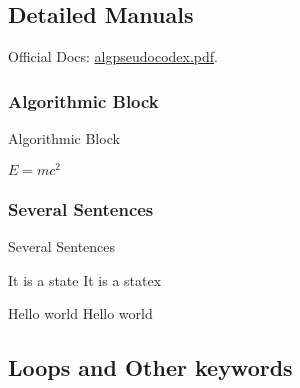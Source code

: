 \documentclass{article}
\begin{document}
\subsection{Detailed Manuals}

Official Docs: \href{https://ctan.math.washington.edu/tex-archive/macros/latex/contrib/algpseudocodex/algpseudocodex.pdf}{algpseudocodex.pdf}.

\subsubsection{Algorithmic Block}

\begin{algorithm}[H]
    \caption{Algorithmic Block}
    \begin{algorithmic}[1]
        \State $E = mc^2$
    \end{algorithmic}
\end{algorithm}

\subsubsection{Several Sentences}

\begin{algorithm}[H]
    \caption{Several Sentences}
    \begin{algorithmic}[1]
        \State It is a state
        \Statex It is a statex

        \State Hello world
        \State {}
        \State \Return Hello world
    \end{algorithmic}
\end{algorithm}


\subsection{Loops and Other keywords}
\end{document}
